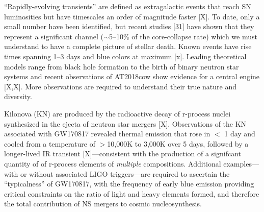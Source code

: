 \documentclass[12pt, letterpaper]{article}
\begin{document}
\medskip



 ``Rapidly-evolving transients'' are defined as extragalactic events that reach SN luminosities but have timescales an order of magnitude faster [X]. To date, only a small number have been identified, but recent studies [31] have shown that they represent a significant channel ($\sim$5--10\% of the core-collapse rate) which we must understand to have a complete picture of stellar death. Known events have rise times spanning 1--3 days and blue colors at maximum  [x]. Leading theoretical models range from black hole formation to the birth of binary neutron star systems and recent observations of AT2018cow show evidence for a central engine [X,X]. More observations are required to understand their true nature and diversity. 



\smallskip
{} 
Kilonova (KN) are produced by the radioactive decay of r-process nuclei synthesized in the ejecta of neutron star mergers [X].  Observations of the KN associated with GW170817 revealed thermal emission that rose in $<$ 1 day and cooled from a temperature of $>$10,000K to 3,000K over 5 days, followed by a longer-lived IR transient [X]---consistent with the production of a signifcant quantity of of r-process elements of \emph{multiple} compositions.  Additional examples---with or without associated LIGO triggers---are required to ascertain the ``typicalness'' of GW170817, with the frequency of early blue emission providing critical constraints on the ratio of light and heavy elements formed, and therefore the total contribution of NS mergers to cosmic nucleosynthesis. 
\end{document}
